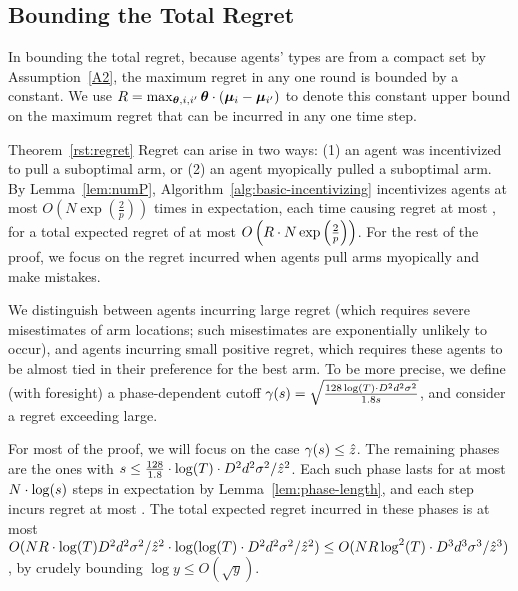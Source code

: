 \subsection{Bounding the Total Regret}
In bounding the total regret, because agents' types are from a compact
set by Assumption~\ref{A2}, the maximum regret in any one round is
bounded by a constant.
We use $R = \max_{\bm{\theta}, i,i'} \bm{\theta} \cdot (\bm{\mu}_{i} - \bm{\mu}_{i'})$
to denote this constant upper bound on the maximum regret that can be
incurred in any one time step. 


\begin{emptyextraproof}{Theorem~\ref{rst:regret}}
Regret can arise in two ways:
(1) an agent was incentivized to pull a suboptimal arm, or
(2) an agent myopically pulled a suboptimal arm.
By Lemma~\ref{lem:numP}, Algorithm~\ref{alg:basic-incentivizing}
incentivizes agents at most 
$O\left( N\exp\left(\frac{2}{p}\right) \right)$
times in expectation, each time causing regret at most \MAXR,
for a total expected regret of at most
$O\left(R\cdot N\exp\left(\frac{2}{p}\right) \right)$.
For the rest of the proof, we focus on the regret incurred when agents
pull arms myopically and make mistakes.

We distinguish between agents incurring large regret
(which requires severe misestimates of arm locations;
such misestimates are exponentially unlikely to occur), 
and agents incurring small positive regret,
which requires these agents to be almost tied in their preference for
the best arm.
To be more precise, we define (with foresight) a phase-dependent
cutoff
$\EarlyCut{s} = \sqrt{\frac{128\log(T) \cdot \Diam^2 d^2 \sigma^2}{1.8 s}}$,
and consider a regret exceeding  large.

For most of the proof, we will focus on the case $\EarlyCut{s} \leq \TieCutoff$.
The remaining phases are the ones with
$s \leq \frac{128}{1.8} \cdot \log(T) \cdot D^2 d^2 \sigma^2/\hat{z}^2$.
Each such phase lasts for at most $N \cdot \log(s)$ steps
in expectation by Lemma~\ref{lem:phase-length},
and each step incurs regret at most \MAXR.
The total expected regret incurred in these phases is at most
$O(N R \cdot \log(T) D^2 d^2 \sigma^2/\hat{z}^2
\cdot \log (\log(T) \cdot D^2 d^2 \sigma^2/\hat{z}^2)
\leq O(N R \log^2(T) \cdot D^3 d^3 \sigma^3/\hat{z}^3)$,
by crudely bounding $\log y \leq O(\sqrt{y})$.


\end{emptyextraproof}
